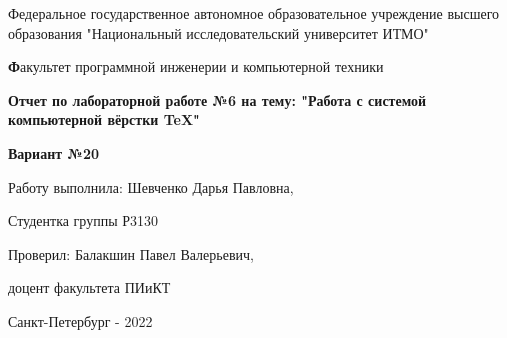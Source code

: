 \begin{center}
\Large Федеральное государственное автономное образовательное учреждение высшего образования "Национальный исследовательский университет ИТМО"

\textbf Факультет программной инженерии и компьютерной техники

\vspace{4cm}
\LARGE \textbf{Отчет по лабораторной работе №6 на тему: "Работа с системой
компьютерной вёрстки \TeX"}

\LARGE\textbf{Вариант №20}
\vspace{4cm}

\begin{flushright}
\Large
	Работу выполнила: Шевченко Дарья Павловна,
	\smallskip
	
	Студентка группы Р3130
	\smallskip
	
	Проверил: Балакшин Павел Валерьевич,
	\smallskip

        доцент факультета ПИиКТ
        \smallskip
	
	\vspace{10cm}
	
\centering Санкт-Петербург - 2022 
\end{flushright}

\end{center}
